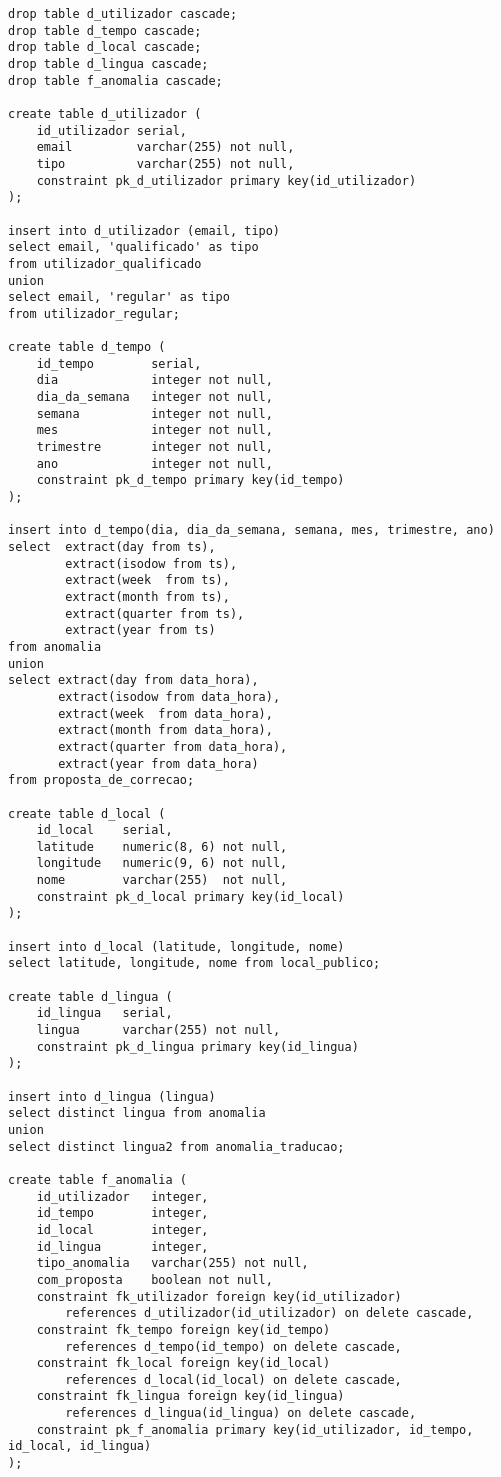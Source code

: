 \documentclass[12pt]{report}
\begin{document}
    \footnotesize \begin{verbatim}
drop table d_utilizador cascade;
drop table d_tempo cascade;
drop table d_local cascade;
drop table d_lingua cascade;
drop table f_anomalia cascade;

create table d_utilizador (
    id_utilizador serial,
    email         varchar(255) not null,
    tipo          varchar(255) not null,
    constraint pk_d_utilizador primary key(id_utilizador)
);

insert into d_utilizador (email, tipo)
select email, 'qualificado' as tipo
from utilizador_qualificado
union
select email, 'regular' as tipo
from utilizador_regular;

create table d_tempo (
    id_tempo        serial,
    dia             integer not null,
    dia_da_semana   integer not null,
    semana          integer not null,
    mes             integer not null,
    trimestre       integer not null,
    ano             integer not null,
    constraint pk_d_tempo primary key(id_tempo)
);

insert into d_tempo(dia, dia_da_semana, semana, mes, trimestre, ano)
select  extract(day from ts),
        extract(isodow from ts),
        extract(week  from ts),
        extract(month from ts),
        extract(quarter from ts),
        extract(year from ts)
from anomalia
union
select extract(day from data_hora),
       extract(isodow from data_hora),
       extract(week  from data_hora),
       extract(month from data_hora),
       extract(quarter from data_hora),
       extract(year from data_hora)
from proposta_de_correcao;

create table d_local (
    id_local    serial,
    latitude    numeric(8, 6) not null,
    longitude   numeric(9, 6) not null,
    nome        varchar(255)  not null,
    constraint pk_d_local primary key(id_local)
);

insert into d_local (latitude, longitude, nome)
select latitude, longitude, nome from local_publico;

create table d_lingua (
    id_lingua   serial,
    lingua      varchar(255) not null,
    constraint pk_d_lingua primary key(id_lingua)
);

insert into d_lingua (lingua)
select distinct lingua from anomalia
union
select distinct lingua2 from anomalia_traducao;

create table f_anomalia (
    id_utilizador   integer,
    id_tempo        integer,
    id_local        integer,
    id_lingua       integer,
    tipo_anomalia   varchar(255) not null,
    com_proposta    boolean not null,
    constraint fk_utilizador foreign key(id_utilizador)
        references d_utilizador(id_utilizador) on delete cascade,
    constraint fk_tempo foreign key(id_tempo)
        references d_tempo(id_tempo) on delete cascade,
    constraint fk_local foreign key(id_local)
        references d_local(id_local) on delete cascade,
    constraint fk_lingua foreign key(id_lingua)
        references d_lingua(id_lingua) on delete cascade,
    constraint pk_f_anomalia primary key(id_utilizador, id_tempo, id_local, id_lingua)
);


\end{verbatim}
\end{document}
